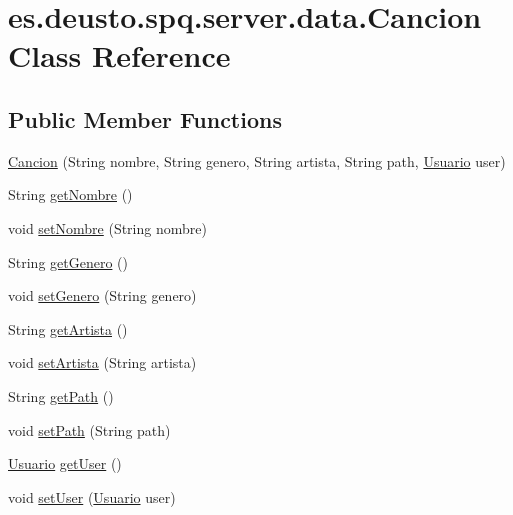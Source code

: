 \hypertarget{classes_1_1deusto_1_1spq_1_1server_1_1data_1_1_cancion}{}\section{es.\+deusto.\+spq.\+server.\+data.\+Cancion Class Reference}
\label{classes_1_1deusto_1_1spq_1_1server_1_1data_1_1_cancion}
\subsection*{Public Member Functions}
\begin{DoxyCompactItemize}
\item 
\hyperlink{classes_1_1deusto_1_1spq_1_1server_1_1data_1_1_cancion_a3cc8f1630dbe98f61a5a3f2e841f3518}{Cancion} (String nombre, String genero, String artista, String path, \hyperlink{classes_1_1deusto_1_1spq_1_1server_1_1data_1_1_usuario}{Usuario} user)
\item 
String \hyperlink{classes_1_1deusto_1_1spq_1_1server_1_1data_1_1_cancion_a25dae3d403cf22e5aaa30fcb061ee4ce}{get\+Nombre} ()
\item 
void \hyperlink{classes_1_1deusto_1_1spq_1_1server_1_1data_1_1_cancion_a4e2aebdcbfe84474a875aea0bf470785}{set\+Nombre} (String nombre)
\item 
String \hyperlink{classes_1_1deusto_1_1spq_1_1server_1_1data_1_1_cancion_a7dc0c2ce1a675f37ff9deeac618c7383}{get\+Genero} ()
\item 
void \hyperlink{classes_1_1deusto_1_1spq_1_1server_1_1data_1_1_cancion_a7878092745fa6b7c59566de3e79855be}{set\+Genero} (String genero)
\item 
String \hyperlink{classes_1_1deusto_1_1spq_1_1server_1_1data_1_1_cancion_a40ba9a2ef4d2e66edd78cecbb288ce09}{get\+Artista} ()
\item 
void \hyperlink{classes_1_1deusto_1_1spq_1_1server_1_1data_1_1_cancion_a4368609aa5226a80579267d6e4c86196}{set\+Artista} (String artista)
\item 
String \hyperlink{classes_1_1deusto_1_1spq_1_1server_1_1data_1_1_cancion_a50bd8db098aef321609e206ee0ea631c}{get\+Path} ()
\item 
void \hyperlink{classes_1_1deusto_1_1spq_1_1server_1_1data_1_1_cancion_aaa89423dcec086b2bcc4c3e20c7ce431}{set\+Path} (String path)
\item 
\hyperlink{classes_1_1deusto_1_1spq_1_1server_1_1data_1_1_usuario}{Usuario} \hyperlink{classes_1_1deusto_1_1spq_1_1server_1_1data_1_1_cancion_aad254029b06bb1ab4886ccb0725c524e}{get\+User} ()
\item 
void \hyperlink{classes_1_1deusto_1_1spq_1_1server_1_1data_1_1_cancion_a6e79df4cf1f7bb65eac8c6f7de3c4fb0}{set\+User} (\hyperlink{classes_1_1deusto_1_1spq_1_1server_1_1data_1_1_usuario}{Usuario} user)
\end{DoxyCompactItemize}


